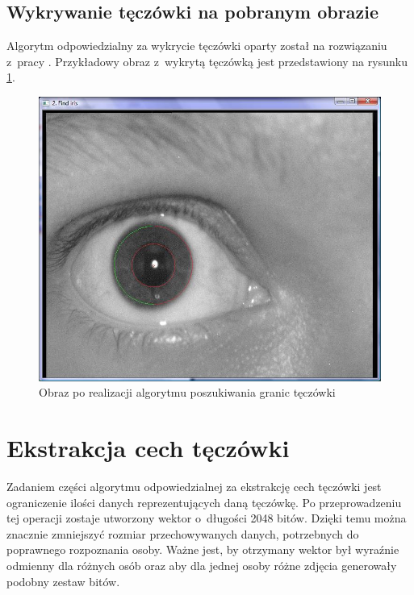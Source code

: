 \subsection{Wykrywanie tęczówki na pobranym obrazie}
\label{subsec:wykrycieTeczowki}
Algorytm odpowiedzialny za wykrycie tęczówki oparty został na rozwiązaniu z~pracy \cite{Gl11}. Przykładowy obraz z~wykrytą tęczówką jest przedstawiony na rysunku \ref{fig:teczowkaNasza}.
\begin{figure}
\begin{center}
\includegraphics[scale=0.5]{teczowka.jpg}
\caption{Obraz po realizacji algorytmu poszukiwania granic tęczówki}
\label{fig:teczowkaNasza}
\end{center}
\end{figure}

\section{Ekstrakcja cech tęczówki}
\label{sec:ekstrakcja}

Zadaniem części algorytmu odpowiedzialnej za ekstrakcję cech tęczówki jest ograniczenie ilości danych reprezentujących daną tęczówkę. Po przeprowadzeniu tej operacji zostaje utworzony wektor o~długości 2048 bitów. Dzięki temu można znacznie zmniejszyć rozmiar przechowywanych danych, potrzebnych do poprawnego rozpoznania osoby. Ważne jest, by otrzymany wektor był wyraźnie odmienny dla różnych osób oraz aby dla jednej osoby różne zdjęcia generowały podobny zestaw bitów. 

